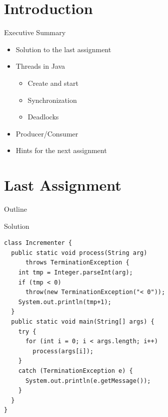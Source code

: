 \section*{Introduction}

\begin{frame}{Executive Summary}
  \begin{itemize}
  \item Solution to the last assignment
  \item Threads in Java
    \begin{itemize}
    \item Create and start
    \item Synchronization
    \item Deadlocks
    \end{itemize}
  \item Producer/Consumer
  \item Hints for the next assignment
  \end{itemize}
\end{frame}


\section{Last Assignment}

\begin{frame}{Outline}
  \tableofcontents[current]
\end{frame}

\begin{frame}[fragile]{Solution}
  \begin{lstlisting}[basicstyle=\ttfamily\small]
class Incrementer {
  public static void process(String arg) 
      throws TerminationException {
    int tmp = Integer.parseInt(arg);
    if (tmp < 0)
      throw(new TerminationException("< 0"));
    System.out.println(tmp+1);    
  }  
  public static void main(String[] args) {
    try {
      for (int i = 0; i < args.length; i++)
        process(args[i]);
    }
    catch (TerminationException e) {
      System.out.println(e.getMessage()); 
    } 
  }
} 
  \end{lstlisting}
\end{frame}


